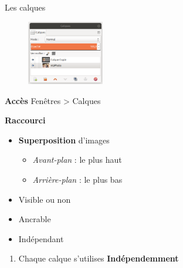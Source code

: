 \documentclass[10pt,svgnames,usenames,table]{beamer}
\begin{document}
\begin{frame}[allowframebreaks]{Les calques}
	\begin{figure}
        	\centering
        	\includegraphics[width=0.3\textwidth]{Images/gimp_calques.png}
    	\end{figure}
    	
	\textbf{Accès} Fenêtres > Calques
	
	\vspace{0.2cm}
	\textbf{Raccourci} 
	
	\framebreak
	
	\begin{itemize}
		\item \textbf{Superposition} d'images
		\begin{itemize}
			\item \textit{Avant-plan} : le plus haut
			\item \textit{Arrière-plan} : le plus bas
		\end{itemize}
		\item Visible ou non 
		\item Ancrable
		\item Indépendant
	\end{itemize}	
	
	\begin{enumerate}
		\item Chaque calque s'utilises \textbf{Indépendemment}
	\end{enumerate}

\end{frame}

\begin{frame}
\end{frame}

\appendix 
\end{document}
